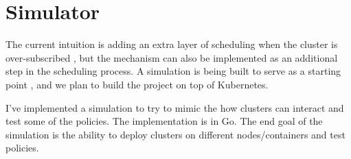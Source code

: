 \section{Simulator}
The current intuition is adding an extra layer 
of scheduling when the cluster is over-subscribed \cite{zaharia_delay_2010}, 
but the mechanism can also be implemented as an additional step in the scheduling process. 
A simulation is being built to serve as a starting point \cite{sched-github}, 
and we plan to build the project on top of Kubernetes.

I've implemented a simulation to try to mimic the how clusters can interact and test some of the policies. 
The implementation is in Go. The end goal of the simulation is the ability to deploy clusters on different 
nodes/containers and test policies.